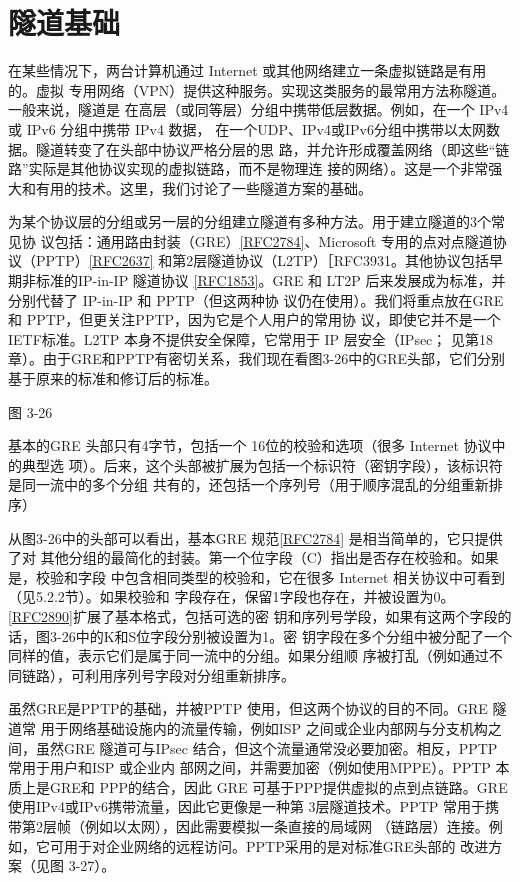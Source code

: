 \section{隧道基础}

在某些情况下，两台计算机通过 Internet 或其他网络建立一条虚拟链路是有用的。虚拟
专用网络（VPN）提供这种服务。实现这类服务的最常用方法称隧道。一般来说，隧道是
在高层（或同等层）分组中携带低层数据。例如，在一个 IPv4或 IPv6 分组中携带 IPv4 数据，
在一个UDP、IPv4或IPv6分组中携带以太网数据。隧道转变了在头部中协议严格分层的思
路，并允许形成覆盖网络（即这些“链路”实际是其他协议实现的虚拟链路，而不是物理连
接的网络）。这是一个非常强大和有用的技术。这里，我们讨论了一些隧道方案的基础。

为某个协议层的分组或另一层的分组建立隧道有多种方法。用于建立隧道的3个常见协
议包括：通用路由封装（GRE）\href{https://www.rfc-editor.org/rfc/rfc2784}{[RFC2784]}、Microsoft 专用的点对点隧道协议（PPTP）\href{https://www.rfc-editor.org/rfc/rfc2637}{[RFC2637]}
和第2层隧道协议（L2TP）［RFC3931。其他协议包括早期非标准的IP-in-IP 隧道协议
\href{https://www.rfc-editor.org/rfc/rfc1853}{[RFC1853]}。GRE 和 LT2P 后来发展成为标准，并分别代替了 IP-in-IP 和 PPTP（但这两种协
议仍在使用）。我们将重点放在GRE 和 PPTP，但更关注PPTP，因为它是个人用户的常用协
议，即使它并不是一个 IETF标准。L2TP 本身不提供安全保障，它常用于 IP 层安全（IPsec；
见第18章）。由于GRE和PPTP有密切关系，我们现在看图3-26中的GRE头部，它们分别
基于原来的标准和修订后的标准。

图 3-26

基本的GRE 头部只有4字节，包括一个 16位的校验和选项（很多 Internet 协议中的典型选
项）。后来，这个头部被扩展为包括一个标识符（密钥字段），该标识符是同一流中的多个分组
共有的，还包括一个序列号（用于顺序混乱的分组重新排序）

从图3-26中的头部可以看出，基本GRE 规范\href{https://www.rfc-editor.org/rfc/rfc2784}{[RFC2784]} 是相当简单的，它只提供了对
其他分组的最简化的封装。第一个位字段（C）指出是否存在校验和。如果是，校验和字段
中包含相同类型的校验和，它在很多 Internet 相关协议中可看到（见5.2.2节）。如果校验和
字段存在，保留1字段也存在，并被设置为0。\href{https://www.rfc-editor.org/rfc/rfc2890}{[RFC2890]}扩展了基本格式，包括可选的密
钥和序列号学段，如果有这两个字段的话，图3-26中的K和S位字段分别被设置为1。密
钥字段在多个分组中被分配了一个同样的值，表示它们是属于同一流中的分组。如果分组顺
序被打乱（例如通过不同链路），可利用序列号字段对分组重新排序。

虽然GRE是PPTP的基础，并被PPTP 使用，但这两个协议的目的不同。GRE 隧道常
用于网络基础设施内的流量传输，例如ISP 之间或企业内部网与分支机构之间，虽然GRE
隧道可与IPsec 结合，但这个流量通常没必要加密。相反，PPTP 常用于用户和ISP 或企业内
部网之间，并需要加密（例如使用MPPE）。PPTP 本质上是GRE和 PPP的结合，因此 GRE
可基于PPP提供虚拟的点到点链路。GRE使用IPv4或IPv6携带流量，因此它更像是一种第
3层隧道技术。PPTP 常用于携带第2层帧（例如以太网），因此需要模拟一条直接的局域网
（链路层）连接。例如，它可用于对企业网络的远程访问。PPTP采用的是对标准GRE头部的
改进方案（见图 3-27）。

